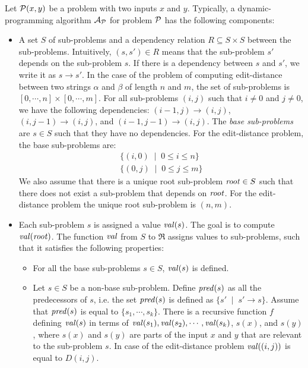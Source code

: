 Let ${\cal P}(x,y)$ be a problem with two inputs $x$ and $y$. Typically,
a dynamic-programming algorithm ${\cal A}_{{\cal P}}$ for problem
${\cal P}$ has the following components: 
\begin{itemize}
\item A set $S$ of sub-problems and a dependency relation $R\subseteq S\times S$
between the sub-problems. Intuitively, $(s,s')\in R$ means that the
sub-problem $s'$ depends on the sub-problem $s$. If there is a dependency
between $s$ and $s'$, we write it as $s\rightarrow s'$. In the
case of the problem of computing edit-distance between two strings
$\alpha$ and $\beta$ of length $n$ and $m$, the set of sub-problems
is $[0,\cdots,n]\times[0,\cdots,m]$. For all sub-problems $(i,j)$
such that $i\not=0$ and $j\not=0$, we have the following dependencies:
$(i-1,j)\rightarrow(i,j)$, $(i,j-1)\rightarrow(i,j)$, and $(i-1,j-1)\rightarrow(i,j)$.
The \textit{base sub-problems} are $s\in S$ such that they have no
dependencies. For the edit-distance problem, the base sub-problems
are: \[
\begin{array}{l}
\{(i,0)\;\mid\;0\leq i\leq n\}\\
\{(0,j)\;\mid\;0\leq j\leq m\}\end{array}\]
 We also assume that there is a unique root sub-problem ${\it root}\in S$
such that there does not exist a sub-problem that depends on ${\it root}$.
For the edit-distance problem the unique root sub-problem is $(n,m)$. 
\item Each sub-problem $s$ is assigned a value ${\it val}(s)$. The goal
is to compute ${\it val}({\it root})$. The function ${\it val}$
from $S$ to $\Re$ assigns values to sub-problems, such that it satisfies
the following properties:

\begin{itemize}
\item For all the base sub-problems $s\in S$, ${\it val}(s)$ is defined. 
\item Let $s\in S$ be a non-base sub-problem. Define ${\it pred}(s)$ as
all the predecessors of $s$, i.e. the set ${\it pred}(s)$ is defined
as $\{s'\;\mid\; s'\rightarrow s\}$. Assume that ${\it pred}(s)$
is equal to $\{s_{1},\cdots,s_{k}\}$. There is a recursive function
$f$ defining ${\it val}(s)$ in terms of ${\it val}(s_{1}),{\it val}(s_{2}),\cdots,{\it val}(s_{k})$,
$s(x)$, and $s(y)$, where $s(x)$ and $s(y)$ are parts of the input
$x$ and $y$ that are relevant to the sub-problem $s$. In case of
the edit-distance problem ${\it val}((i,j))$ is equal to $D(i,j)$. 
\end{itemize}
\end{itemize}
